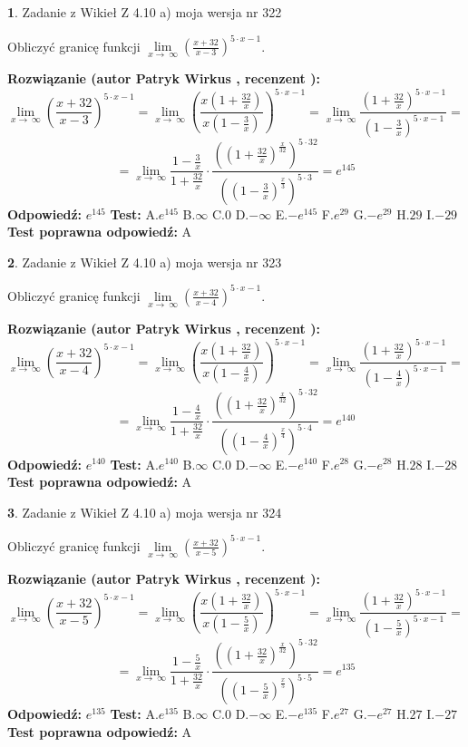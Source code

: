 \documentclass[12pt, a4paper]{article}
\theoremstyle{definition} %
\newtheorem{zad}{}
\newcommand{\zadStart}[1]{\begin{zad}#1\newline}
\newcommand{\zadStop}{\end{zad}}
\newcommand{\rozwStart}[2]{\noindent \textbf{Rozwiązanie (autor #1 , recenzent #2): }\newline}
\newcommand{\rozwStop}{\newline}
\newcommand{\odpStart}{\noindent \textbf{Odpowiedź:}\newline}
\newcommand{\odpStop}{\newline}
\newcommand{\testStart}{\noindent \textbf{Test:}\newline}
\newcommand{\testStop}{\newline}
\newcommand{\kluczStart}{\noindent \textbf{Test poprawna odpowiedź:}\newline}
\newcommand{\kluczStop}{\newline}
\begin{document}
\zadStart{Zadanie z Wikieł Z 4.10 a) moja wersja nr 322}

Obliczyć granicę funkcji  $\lim\limits_{x\to\ \infty}(\frac{x+32}{x-3})^{5\cdot x-1}$.
\zadStop
\rozwStart{Patryk Wirkus}{}
$$\lim\limits_{x\to\ \infty}(\frac{x+32}{x-3})^{5\cdot x-1} = \lim\limits_{x\to\ \infty}(\frac{x(1+\frac{32}{x})}{x(1-\frac{3}{x})})^{5\cdot x-1}=\lim\limits_{x\to\ \infty}\frac{(1+\frac{32}{x})^{5\cdot x-1}}{(1-\frac{3}{x})^{5\cdot x-1}}=$$
$$=\lim\limits_{x\to\ \infty}\frac{1-\frac{3}{x}}{1+\frac{32}{x}}\cdot\frac{((1+\frac{32}{x})^{\frac{x}{32}})^{5\cdot32}}{((1-\frac{3}{x})^{\frac{x}{3}})^{5\cdot3}}=e^{145}$$
\rozwStop
\odpStart
$e^{145}$
\odpStop
\testStart
A.$e^{145}$ B.$\infty$ C.$0$ D.$-\infty$ E.$-e^{145}$
F.$e^{29}$ G.$-e^{29}$
H.$29$
I.$-29$
\testStop
\kluczStart
A
\kluczStop



\zadStart{Zadanie z Wikieł Z 4.10 a) moja wersja nr 323}

Obliczyć granicę funkcji  $\lim\limits_{x\to\ \infty}(\frac{x+32}{x-4})^{5\cdot x-1}$.
\zadStop
\rozwStart{Patryk Wirkus}{}
$$\lim\limits_{x\to\ \infty}(\frac{x+32}{x-4})^{5\cdot x-1} = \lim\limits_{x\to\ \infty}(\frac{x(1+\frac{32}{x})}{x(1-\frac{4}{x})})^{5\cdot x-1}=\lim\limits_{x\to\ \infty}\frac{(1+\frac{32}{x})^{5\cdot x-1}}{(1-\frac{4}{x})^{5\cdot x-1}}=$$
$$=\lim\limits_{x\to\ \infty}\frac{1-\frac{4}{x}}{1+\frac{32}{x}}\cdot\frac{((1+\frac{32}{x})^{\frac{x}{32}})^{5\cdot32}}{((1-\frac{4}{x})^{\frac{x}{4}})^{5\cdot4}}=e^{140}$$
\rozwStop
\odpStart
$e^{140}$
\odpStop
\testStart
A.$e^{140}$ B.$\infty$ C.$0$ D.$-\infty$ E.$-e^{140}$
F.$e^{28}$ G.$-e^{28}$
H.$28$
I.$-28$
\testStop
\kluczStart
A
\kluczStop



\zadStart{Zadanie z Wikieł Z 4.10 a) moja wersja nr 324}

Obliczyć granicę funkcji  $\lim\limits_{x\to\ \infty}(\frac{x+32}{x-5})^{5\cdot x-1}$.
\zadStop
\rozwStart{Patryk Wirkus}{}
$$\lim\limits_{x\to\ \infty}(\frac{x+32}{x-5})^{5\cdot x-1} = \lim\limits_{x\to\ \infty}(\frac{x(1+\frac{32}{x})}{x(1-\frac{5}{x})})^{5\cdot x-1}=\lim\limits_{x\to\ \infty}\frac{(1+\frac{32}{x})^{5\cdot x-1}}{(1-\frac{5}{x})^{5\cdot x-1}}=$$
$$=\lim\limits_{x\to\ \infty}\frac{1-\frac{5}{x}}{1+\frac{32}{x}}\cdot\frac{((1+\frac{32}{x})^{\frac{x}{32}})^{5\cdot32}}{((1-\frac{5}{x})^{\frac{x}{5}})^{5\cdot5}}=e^{135}$$
\rozwStop
\odpStart
$e^{135}$
\odpStop
\testStart
A.$e^{135}$ B.$\infty$ C.$0$ D.$-\infty$ E.$-e^{135}$
F.$e^{27}$ G.$-e^{27}$
H.$27$
I.$-27$
\testStop
\kluczStart
A
\kluczStop
\end{document}

